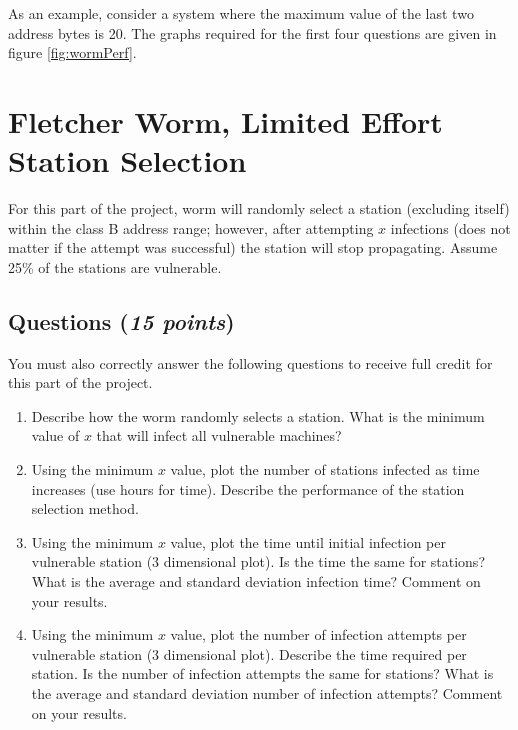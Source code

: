 \documentclass[10pt]{article}
\newcommand{\Section}[1]{
\noindent
\hrulefill
\vspace{-0.15in}
\section{#1}
}
\newcommand{\Questions}[1]{
\subsection*{Questions {\rm \normalsize (\textsf{\textit{#1 points}})}}
}
\begin{document}
As an example, consider a system where the maximum value of the
last two address bytes is 20. The graphs required for the first
four questions are given in figure \ref{fig:wormPerf}.


\Section{Fletcher Worm, Limited Effort Station Selection}

For this part of the project, worm will randomly select a station
(excluding itself) within the class B address range; however,
after attempting $x$ infections (does not matter if the attempt
was successful) the station will stop propagating. Assume 25\% of
the stations are vulnerable.

\Questions{15}
You must also correctly answer the following questions to receive
full credit for this part of the project.
\begin{enumerate}
  \item Describe how the worm randomly selects a station. What is
the minimum value of $x$ that will infect all vulnerable machines?

  \item Using the minimum $x$ value, plot the number of stations infected
as time increases (use hours for time). Describe the performance
of the station selection method.

  \item Using the minimum $x$ value, plot the time until initial
infection per vulnerable station (3 dimensional plot). Is the time
the same for stations? What is the average and standard deviation
infection time? Comment on your results.

  \item Using the minimum $x$ value, plot the number of infection
attempts per vulnerable station (3 dimensional plot). Describe the
time required per station. Is the number of infection attempts the
same for stations? What is the average and standard deviation
number of  infection attempts? Comment on your results.
\end{enumerate}
\end{document}

